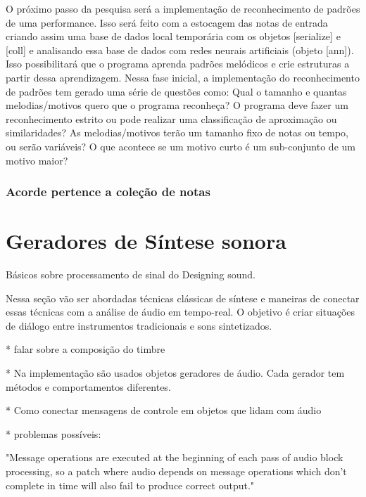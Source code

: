 \documentclass[draft]{ppgmus}
\begin{document}
O próximo passo da pesquisa será a implementação de reconhecimento de padrões de uma performance. 
Isso será feito com a estocagem das notas de entrada criando assim uma base de dados local temporária
com os objetos [serialize] e [coll] e analisando essa base de dados com redes neurais artificiais 
(objeto [ann]). Isso possibilitará que o programa aprenda padrões melódicos e crie estruturas a 
partir dessa aprendizagem.
	Nessa fase inicial, a implementação do reconhecimento de padrões tem gerado uma série de 
questões como: Qual o tamanho e quantas melodias/motivos quero que o programa reconheça? O programa 
deve fazer um reconhecimento estrito ou pode realizar uma classificação de aproximação ou 
similaridades? As melodias/motivos terão um tamanho fixo de notas ou tempo, ou serão variáveis? 
O que acontece se um motivo curto é um sub-conjunto de um motivo maior?





\subsubsection{Acorde pertence a coleção de notas}






\pagebreak

\section{Geradores de Síntese sonora}

Básicos sobre processamento de sinal do Designing sound.

Nessa seção vão ser abordadas técnicas clássicas de síntese
e maneiras de conectar essas técnicas com a análise
de áudio em tempo-real. O objetivo é criar situações
de diálogo entre instrumentos tradicionais e sons sintetizados.


* falar sobre a composição do timbre

* Na implementação são usados objetos geradores de áudio.
Cada gerador tem métodos e comportamentos diferentes.

* Como conectar mensagens de controle em objetos que lidam com áudio

* problemas possíveis: 

"Message operations are executed at the beginning of each pass of audio
block processing, so a patch where audio depends on message operations
which don't complete in time will also fail to produce correct output."
\end{document}
